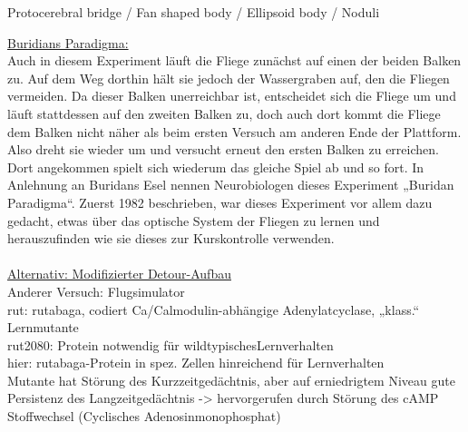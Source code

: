 \documentclass[12pt,a4paper]{article}
\begin{document}
Protocerebral bridge / Fan shaped body / Ellipsoid body / Noduli

\underline{Buridians Paradigma:}\\
Auch in diesem Experiment läuft die Fliege zunächst auf einen der beiden Balken zu. Auf dem Weg dorthin hält sie jedoch der Wassergraben auf, den die Fliegen vermeiden. Da dieser Balken unerreichbar ist, entscheidet sich die Fliege um und läuft stattdessen auf den zweiten Balken zu, doch auch dort kommt die Fliege dem Balken nicht näher als beim ersten Versuch am anderen Ende der Plattform. Also dreht sie wieder um und versucht erneut den ersten Balken zu erreichen. Dort angekommen spielt sich wiederum das gleiche Spiel ab und so fort. In Anlehnung an Buridans Esel nennen Neurobiologen dieses Experiment „Buridan Paradigma“. Zuerst 1982 beschrieben, war dieses Experiment vor allem dazu gedacht, etwas über das optische System der Fliegen zu lernen und herauszufinden wie sie dieses zur Kurskontrolle verwenden.
\\\\
\underline{Alternativ: Modifizierter Detour-Aufbau}\\
Anderer Versuch: Flugsimulator\\
rut: rutabaga, codiert Ca/Calmodulin-abhängige Adenylatcyclase, „klass.“ Lernmutante\\
rut2080: Protein notwendig für wildtypischesLernverhalten\\
hier: rutabaga-Protein in spez. Zellen hinreichend für Lernverhalten\\
Mutante hat Störung des Kurzzeitgedächtnis, aber auf erniedrigtem Niveau gute Persistenz des Langzeitgedächtnis -> hervorgerufen durch Störung des cAMP Stoffwechsel (Cyclisches Adenosinmonophosphat)
\end{document}
